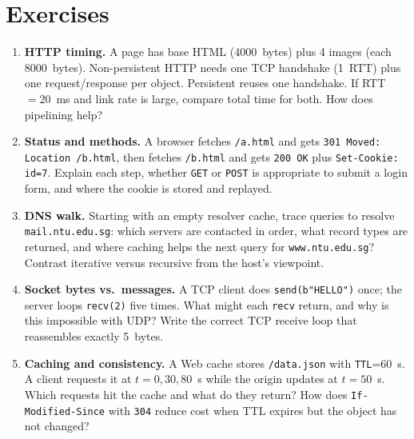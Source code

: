 \section{Exercises}
\label{sec:ch02-exercises}
\begin{enumerate}[label=E2.\arabic*, leftmargin=*, itemsep=0.8em]
    \item \textbf{HTTP timing.} A page has base HTML (4000~bytes) plus 4 images (each 8000~bytes). Non-persistent HTTP needs one TCP handshake (1~RTT) plus one request/response per object. Persistent reuses one handshake. If RTT$=20$~ms and link rate is large, compare total time for both. How does pipelining help?
    \item \textbf{Status and methods.} A browser fetches \texttt{/a.html} and gets \texttt{301 Moved: Location /b.html}, then fetches \texttt{/b.html} and gets \texttt{200 OK} plus \texttt{Set-Cookie: id=7}. Explain each step, whether \texttt{GET} or \texttt{POST} is appropriate to submit a login form, and where the cookie is stored and replayed.
    \item \textbf{DNS walk.} Starting with an empty resolver cache, trace queries to resolve \texttt{mail.ntu.edu.sg}: which servers are contacted in order, what record types are returned, and where caching helps the next query for \texttt{www.ntu.edu.sg}? Contrast iterative versus recursive from the host's viewpoint.
    \item \textbf{Socket bytes vs.\ messages.} A TCP client does \texttt{send(b"HELLO")} once; the server loops \texttt{recv(2)} five times. What might each \texttt{recv} return, and why is this impossible with UDP? Write the correct TCP receive loop that reassembles exactly 5~bytes.
    \item \textbf{Caching and consistency.} A Web cache stores \texttt{/data.json} with \texttt{TTL}=60~s. A client requests it at $t=0, 30, 80$~s while the origin updates at $t=50$~s. Which requests hit the cache and what do they return? How does \texttt{If-Modified-Since} with \texttt{304} reduce cost when TTL expires but the object has not changed?
\end{enumerate}

